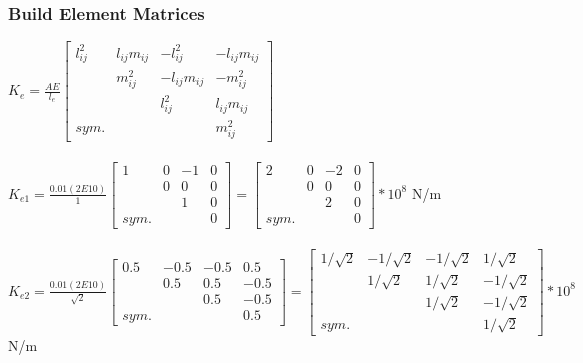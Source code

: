 \documentclass{article}
\begin{document}
\subsubsection*{Build Element Matrices}
$K_e=\frac{AE}{l_e}
\begin{bmatrix}
    l_{ij}^2 & l_{ij}m_{ij} & -l_{ij}^2 & -l_{ij}m_{ij} \\
    & m_{ij}^2 & -l_{ij}m_{ij} & -m_{ij}^2 \\
    & & l_{ij}^2 & l_{ij}m_{ij} \\
    sym. & & & m_{ij}^2
\end{bmatrix}$ \\\\
$K_{e1}=\frac{0.01(2E10)}{1}\begin{bmatrix}
    1 & 0 & -1 & 0 \\
    & 0 & 0 & 0 \\
    & & 1 & 0 \\
    sym. & & & 0
\end{bmatrix}=\begin{bmatrix}
    2 & 0 & -2 & 0 \\
    & 0 & 0 & 0 \\
    & & 2 & 0 \\
    sym. & & & 0
\end{bmatrix}*10^8$ N/m \\\\
$K_{e2}=\frac{0.01(2E10)}{\sqrt{2}}\begin{bmatrix}
    0.5 & -0.5 & -0.5 & 0.5 \\
    & 0.5 & 0.5 & -0.5 \\
    & & 0.5 & -0.5 \\
    sym. & & & 0.5
\end{bmatrix}=\begin{bmatrix}
    1/\sqrt{2} & -1/\sqrt{2} & -1/\sqrt{2} & 1/\sqrt{2} \\
    & 1/\sqrt{2} & 1/\sqrt{2} & -1/\sqrt{2} \\
    & & 1/\sqrt{2} & -1/\sqrt{2} \\
    sym. & & & 1/\sqrt{2}
\end{bmatrix}*10^8$ N/m
\end{document}
